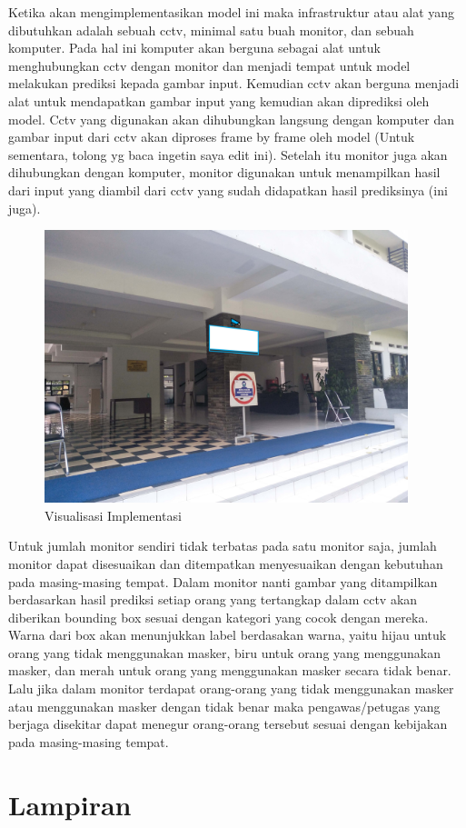 \documentclass{article}
\begin{document}
  	\par Ketika akan mengimplementasikan model ini maka infrastruktur atau alat yang dibutuhkan adalah sebuah cctv, minimal satu buah monitor, dan sebuah komputer. Pada hal ini komputer akan berguna sebagai alat untuk menghubungkan cctv dengan monitor dan menjadi tempat untuk model melakukan prediksi kepada gambar input. Kemudian cctv akan berguna menjadi alat untuk mendapatkan gambar input yang kemudian akan diprediksi oleh model. Cctv yang digunakan akan dihubungkan langsung dengan komputer dan gambar input dari cctv akan diproses frame by frame oleh model (Untuk sementara, tolong yg baca ingetin saya edit ini). Setelah itu monitor juga akan dihubungkan dengan komputer, monitor digunakan untuk menampilkan hasil dari input yang diambil dari cctv yang sudah didapatkan hasil prediksinya (ini juga). 
  	\begin{figure}[H]
  		\centering
  		\includegraphics[width=400px]{implementasi/test.jpg}
  		\caption{Visualisasi Implementasi}
  	\end{figure}
	\par Untuk jumlah monitor sendiri tidak terbatas pada satu monitor saja, jumlah monitor dapat disesuaikan dan ditempatkan menyesuaikan dengan kebutuhan pada masing-masing tempat. Dalam monitor nanti gambar yang ditampilkan berdasarkan hasil prediksi setiap orang yang tertangkap dalam cctv akan diberikan bounding box sesuai dengan kategori yang cocok dengan mereka. Warna dari box akan menunjukkan label berdasakan warna, yaitu hijau untuk orang yang tidak menggunakan masker, biru untuk orang yang menggunakan masker, dan merah untuk orang yang menggunakan masker secara tidak benar. Lalu jika dalam monitor terdapat orang-orang yang tidak menggunakan masker atau menggunakan masker dengan tidak benar maka pengawas/petugas yang berjaga disekitar dapat menegur orang-orang tersebut sesuai dengan kebijakan pada masing-masing tempat.
  \section{Lampiran}
  \newpage
  \printbibliography[title={Referensi}]
\end{document}
